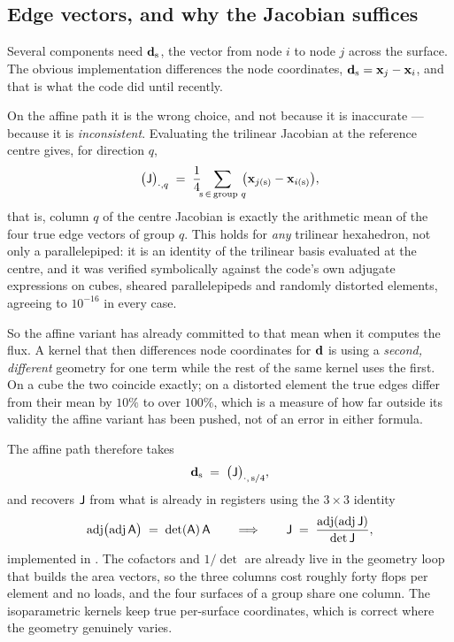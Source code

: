 \subsection{Edge vectors, and why the Jacobian suffices}
\label{sec:geom:edges}

Several components need $\mathbf{d}_{\mathrm{s}}$, the vector from node $i$ to node $j$ across the surface.
The obvious implementation differences the node coordinates, $\mathbf{d}_{\mathrm{s}} = \mathbf{x}_j - \mathbf{x}_i$,
and that is what the code did until recently.

On the affine path it is the wrong choice, and not because it is inaccurate --- because it is
\emph{inconsistent}. Evaluating the trilinear Jacobian at the reference centre gives, for
direction $q$,
\begin{equation}
\bigl(\mathsf{J}\bigr)_{\cdot,q} \;=\; \frac{1}{4}\!\!\sum_{\mathrm{s} \,\in\, \text{group } q}\!\!
      \bigl(\mathbf{x}_{j(\mathrm{s})} - \mathbf{x}_{i(\mathrm{s})}\bigr),
\label{eq:col-is-mean}
\end{equation}
that is, column $q$ of the centre Jacobian is exactly the arithmetic mean of the four true edge
vectors of group $q$. This holds for \emph{any} trilinear hexahedron, not only a parallelepiped:
it is an identity of the trilinear basis evaluated at the centre, and it was verified
symbolically against the code's own adjugate expressions on cubes, sheared parallelepipeds and
randomly distorted elements, agreeing to $10^{-16}$ in every case.

So the affine variant has already committed to that mean when it computes the flux. A kernel that
then differences node coordinates for $\mathbf{d}$ is using a \emph{second, different} geometry for one
term while the rest of the same kernel uses the first. On a cube the two coincide exactly; on a
distorted element the true edges differ from their mean by $10\%$ to over $100\%$, which is a
measure of how far outside its validity the affine variant has been pushed, not of an error in
either formula.

The affine path therefore takes
\begin{equation}
\mathbf{d}_{\mathrm{s}} \;=\; \bigl(\mathsf{J}\bigr)_{\cdot,\,\mathrm{s}/4},
\end{equation}
and recovers $\mathsf{J}$ from what is already in registers using the $3\times 3$ identity
\begin{equation}
\operatorname{adj}\bigl(\operatorname{adj} \mathsf{A}\bigr) \;=\; \det(\mathsf{A})\,\mathsf{A}
\qquad\Longrightarrow\qquad
\mathsf{J} \;=\; \frac{\operatorname{adj}(\operatorname{adj}\mathsf{J})}{\det\mathsf{J}} ,
\label{eq:adj-adj}
\end{equation}
implemented in . The cofactors and $1/\det$ are already live
in the geometry loop that builds the area vectors, so the three columns cost roughly forty flops
per element and no loads, and the four surfaces of a group share one column. The isoparametric
kernels keep true per-surface coordinates, which is correct where the geometry genuinely varies.

